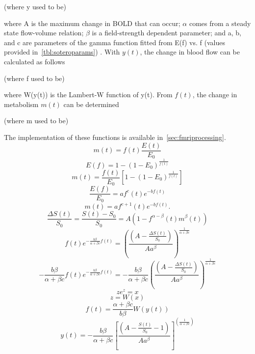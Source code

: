     (where y used to be)

  where A is the maximum change in BOLD that can occur; $\alpha$ comes from a steady state flow-volume relation; $\beta$ is a field-strength dependent parameter; and a, b, and c are parameters of the gamma function fitted from E(f) vs. f (values provided in~\cref{tbl:soteroparams}) \cite{sotero2011}. With $y(t)$,  the change in blood flow can be calculated as follows

  (where f used to be)

  where W(y(t)) is the Lambert-W function of y(t). From $f(t)$, the change in metabolism $m(t)$ can be determined

  (where m used to be)

  The implementation of these functions is available in~\cref{sec:fmriprocessing}. 
  \begin{equation}
    \label{eq:mf}
    m(t)=f(t)\frac{E(t)}{E_0}
  \end{equation}
  \begin{equation}
    \label{eq:E}
    E(f)=1-(1-E_0)^{\frac{1}{f(t)}}
  \end{equation}
  \begin{equation}
    \label{eq:EmfCombined}
    m(t)=\frac{f(t)}{E_0}\left[1-(1-E_0)^{\frac{1}{f(t)}}\right]
  \end{equation}
  \begin{equation}
    \label{eq:gammafct}
    \frac{E(f)}{E_0}=af^{c}(t)e^{-bf(t)}
  \end{equation}
  \begin{equation}
    \label{eq:m} 
    m(t)=af^{c+1}(t)e^{-bf(t)}.
  \end{equation}
  \begin{equation}
    \label{eq:S}
    \frac{\Delta S(t)}{S_0} = \frac{S(t)-S_0}{S_0} = A(1-f^{\alpha-\beta}(t) m^\beta(t))
  \end{equation}
  \begin{equation}
    \label{eq:mAndS}
    f(t)e^{-\frac{b \beta}{\alpha + \beta c}f(t)}=\left(\frac{\left(A-\frac{\Delta S(t)}{S_0}\right)}{A a^\beta}\right)^{\frac{1}{\alpha+\beta c}}
  \end{equation}
  \begin{equation}
    \label{eq:mAndSmultiplied}
    -\frac{b\beta}{\alpha+\beta c} f(t)e^{-\frac{b \beta}{\alpha + \beta c}f(t)}=-\frac{b\beta}{\alpha+\beta c} \left(\frac{\left(A-\frac{\Delta S(t)}{S_0}\right)}{A a^\beta}\right)^{\frac{1}{\alpha+\beta c}}
  \end{equation}
  \begin{equation}
    \label{eq:lambertWsetup}
    z e^z = x
  \end{equation}
  \begin{equation}
    \label{eq:lambertW}
    z=W(x)
  \end{equation}
  \begin{equation}
    \label{eq:f}
    f(t)=\frac{\alpha+\beta c}{b \beta}W(y(t))
  \end{equation}
  \begin{equation}
    \label{eq:y} 
  	y(t)=-\frac{b \beta}{\alpha+\beta c} \left[\frac{(A-\frac{S(t)}{S_{0}}-1)}{A a^{\beta}}\right]^{\left(\frac{1}{\alpha+\beta c}\right)} 
  \end{equation}
